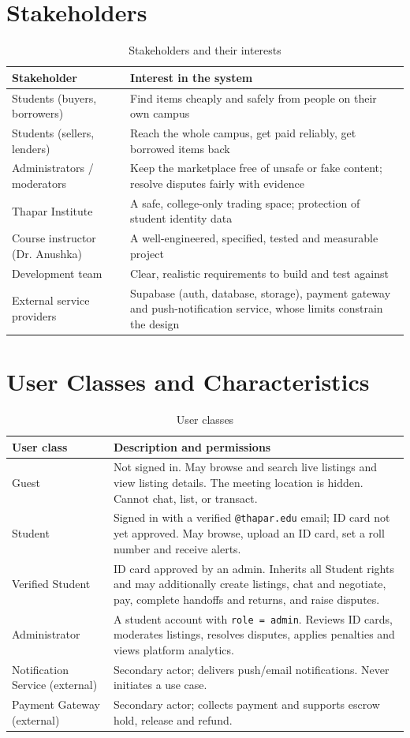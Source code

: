 \documentclass[11pt,a4paper]{scrreprt}
\begin{document}
\section{Stakeholders}
\begin{longtable}{L{3.6cm} L{11.6cm}}
\caption{Stakeholders and their interests}\label{tab:stakeholders}\\
\toprule
\textbf{Stakeholder} & \textbf{Interest in the system}\\ \midrule\endhead
Students (buyers, borrowers) & Find items cheaply and safely from people on their own campus\\
Students (sellers, lenders) & Reach the whole campus, get paid reliably, get borrowed items back\\
Administrators / moderators & Keep the marketplace free of unsafe or fake content; resolve disputes fairly with evidence\\
Thapar Institute & A safe, college-only trading space; protection of student identity data\\
Course instructor (Dr. Anushka) & A well-engineered, specified, tested and measurable project\\
Development team & Clear, realistic requirements to build and test against\\
External service providers & Supabase (auth, database, storage), payment gateway and push-notification service, whose limits constrain the design\\
\bottomrule
\end{longtable}

\section{User Classes and Characteristics}
\begin{longtable}{L{3cm} L{12.2cm}}
\caption{User classes}\label{tab:users}\\
\toprule
\textbf{User class} & \textbf{Description and permissions}\\ \midrule\endhead
Guest & Not signed in. May browse and search live listings and view listing details. The meeting location is hidden. Cannot chat, list, or transact.\\
Student & Signed in with a verified \texttt{@thapar.edu} email; ID card not yet approved. May browse, upload an ID card, set a roll number and receive alerts.\\
Verified Student & ID card approved by an admin. Inherits all Student rights and may additionally create listings, chat and negotiate, pay, complete handoffs and returns, and raise disputes.\\
Administrator & A student account with \texttt{role = admin}. Reviews ID cards, moderates listings, resolves disputes, applies penalties and views platform analytics.\\
Notification Service (external) & Secondary actor; delivers push/email notifications. Never initiates a use case.\\
Payment Gateway (external) & Secondary actor; collects payment and supports escrow hold, release and refund.\\
\bottomrule
\end{longtable}
\end{document}

